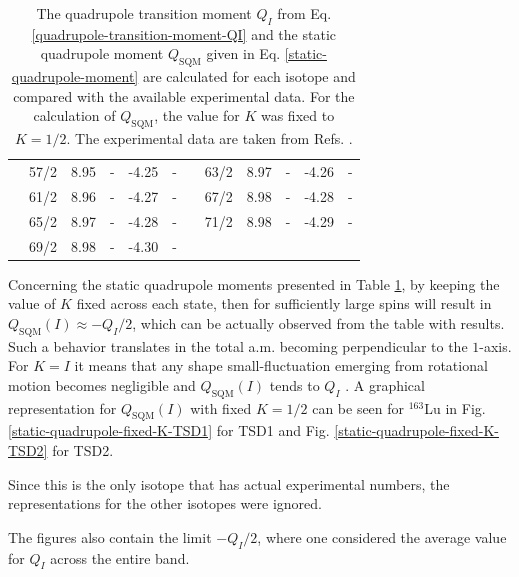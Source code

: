 \begin{table}
{\begin{tabular}{|c|c|c|c|c|c|c|ccccc|}
    & 57/2 & 8.95 & - & -4.25 & - &  & \multicolumn{1}{c|}{63/2} & \multicolumn{1}{c|}{8.97} & \multicolumn{1}{c|}{-} & \multicolumn{1}{c|}{-4.26} & - \\ \cline{2-6} \cline{8-12} 
    & 61/2 & 8.96 & - & -4.27 & - &  & \multicolumn{1}{c|}{67/2} & \multicolumn{1}{c|}{8.98} & \multicolumn{1}{c|}{-} & \multicolumn{1}{c|}{-4.28} & - \\ \cline{2-6} \cline{8-12} 
    & 65/2 & 8.97 & - & -4.28 & - &  & \multicolumn{1}{c|}{71/2} & \multicolumn{1}{c|}{8.98} & \multicolumn{1}{c|}{-} & \multicolumn{1}{c|}{-4.29} & - \\ \cline{2-6} \cline{8-12} 
    & 69/2 & 8.98 & - & -4.30 & - &  & \multicolumn{5}{c|}{} \\ \hline
    \end{tabular}%
    }
    \caption{The quadrupole transition moment $Q_I$ from Eq. \ref{quadrupole-transition-moment-QI} and the static quadrupole moment $Q_\text{SQM}$ given in Eq. \ref{static-quadrupole-moment} are calculated for each isotope and compared with the available experimental data. For the calculation of $Q_\text{SQM}$, the value for $K$ was fixed to $K=1/2$. The experimental data are taken from Refs. \cite{gorgen2004quadrupole,jensen2002wobbling,reich2010nuclear}.}
    \label{table-quadrupole-QI-QSQM-numerical-results}
\end{table}

Concerning the static quadrupole moments presented in Table \ref{table-quadrupole-QI-QSQM-numerical-results}, by keeping the value of $K$ fixed across each state, then for sufficiently large spins will result in $Q_\text{SQM}(I)\approx -Q_I/2$, which can be actually observed from the table with results. Such a behavior translates in the total a.m. becoming perpendicular to the $1$-axis. For $K=I$ it means that any shape small-fluctuation emerging from rotational motion becomes negligible and $Q_\text{SQM}(I)$ tends to $Q_I$ \cite{bohr1998nuclear}. A graphical representation for $Q_\text{SQM}(I)$ with fixed $K=1/2$ can be seen for $^{163}$Lu in Fig. \ref{static-quadrupole-fixed-K-TSD1} for TSD1 and Fig. \ref{static-quadrupole-fixed-K-TSD2} for TSD2. 

Since this is the only isotope that has actual experimental numbers, the representations for the other isotopes were ignored. 

The figures also contain the limit $-Q_I/2$, where one considered the average value for $Q_I$ across the entire band.

